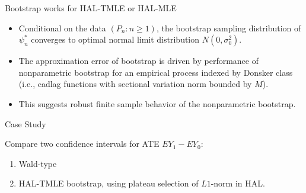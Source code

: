 \documentclass[t]{beamer}
\newlength{\wideitemsep}
\let\olditem\item
\renewcommand{\item}{\setlength{\itemsep}{\wideitemsep}\olditem}
\begin{document}
 \begin{frame}{Bootstrap works for HAL-TMLE or HAL-MLE}
 \begin{itemize}
 \item Conditional on the data $(P_n:n\geq 1)$, the bootstrap sampling distribution of  $\psi_n^*$ converges to optimal normal limit distribution $N(0,\sigma^2_0)$.
 \item The approximation error of bootstrap is driven by performance of nonparametric bootstrap for an empirical process indexed by Donsker class (i.e., cadlag functions with sectional variation norm bounded by $M$).
 \item This suggests  robust finite sample behavior of the nonparametric bootstrap.
 \end{itemize}
 \end{frame}\begin{frame}{Case Study}


Compare two confidence intervals for ATE $EY_1-EY_0$:
\begin{enumerate}
\item Wald-type
\item HAL-TMLE bootstrap, using plateau selection of $L1$-norm in HAL.
\end{enumerate}

\end{frame}
\end{document}
